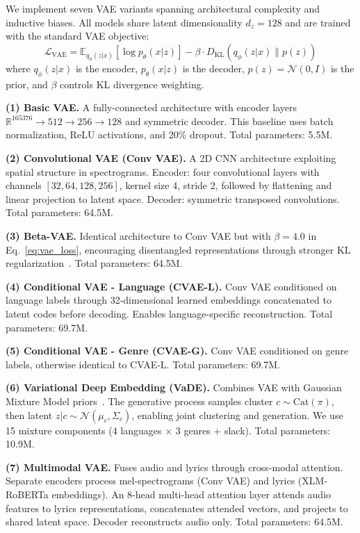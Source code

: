 \documentclass[10pt,twocolumn]{article}
\begin{document}
We implement seven VAE variants spanning architectural complexity and inductive biases. All models share latent dimensionality $d_z = 128$ and are trained with the standard VAE objective:
\begin{equation}
\mathcal{L}_{\text{VAE}} = \mathbb{E}_{q_\phi(z|x)}[\log p_\theta(x|z)] - \beta \cdot D_{\text{KL}}(q_\phi(z|x) \| p(z))
\label{eq:vae_loss}
\end{equation}
where $q_\phi(z|x)$ is the encoder, $p_\theta(x|z)$ is the decoder, $p(z) = \mathcal{N}(0, I)$ is the prior, and $\beta$ controls KL divergence weighting.

\textbf{(1) Basic VAE.} A fully-connected architecture with encoder layers $\mathbb{R}^{165376} \rightarrow 512 \rightarrow 256 \rightarrow 128$ and symmetric decoder. This baseline uses batch normalization, ReLU activations, and 20\% dropout. Total parameters: 5.5M.

\textbf{(2) Convolutional VAE (Conv VAE).} A 2D CNN architecture exploiting spatial structure in spectrograms. Encoder: four convolutional layers with channels $[32, 64, 128, 256]$, kernel size 4, stride 2, followed by flattening and linear projection to latent space. Decoder: symmetric transposed convolutions. Total parameters: 64.5M.

\textbf{(3) Beta-VAE.} Identical architecture to Conv VAE but with $\beta=4.0$ in Eq.~\ref{eq:vae_loss}, encouraging disentangled representations through stronger KL regularization~\cite{higgins2017beta}. Total parameters: 64.5M.

\textbf{(4) Conditional VAE - Language (CVAE-L).} Conv VAE conditioned on language labels through 32-dimensional learned embeddings concatenated to latent codes before decoding. Enables language-specific reconstruction. Total parameters: 69.7M.

\textbf{(5) Conditional VAE - Genre (CVAE-G).} Conv VAE conditioned on genre labels, otherwise identical to CVAE-L. Total parameters: 69.7M.

\textbf{(6) Variational Deep Embedding (VaDE).} Combines VAE with Gaussian Mixture Model priors~\cite{jiang2017variational}. The generative process samples cluster $c \sim \text{Cat}(\pi)$, then latent $z|c \sim \mathcal{N}(\mu_c, \Sigma_c)$, enabling joint clustering and generation. We use 15 mixture components (4 languages $\times$ 3 genres + slack). Total parameters: 10.9M.

\textbf{(7) Multimodal VAE.} Fuses audio and lyrics through cross-modal attention. Separate encoders process mel-spectrograms (Conv VAE) and lyrics (XLM-RoBERTa embeddings). An 8-head multi-head attention layer attends audio features to lyrics representations, concatenates attended vectors, and projects to shared latent space. Decoder reconstructs audio only. Total parameters: 64.5M.
\end{document}
